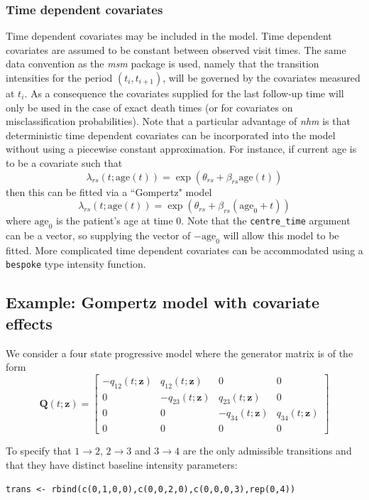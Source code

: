 \documentclass{article}
\numberwithin{equation}{section}
\begin{document}
\subsubsection{Time dependent covariates}

Time dependent covariates may be included in the model. Time dependent covariates are assumed to be constant between observed visit times. The same data convention as the {\it msm} package is used, namely that  the transition intensities for the period $(t_i, t_{i+1})$, will be governed by the covariates measured at $t_i$. As a consequence the covariates supplied for the last follow-up time will only be used in the case of exact death times (or for covariates on misclassification probabilities). Note that a particular advantage of {\it nhm} is that deterministic time dependent covariates can be incorporated into the model without using a piecewise constant approximation. For instance, if current age is to be a covariate such that
$$\lambda_{rs}(t ; \mbox{age}(t)) = \exp(\theta_{rs} + \beta_{rs} \mbox{age}(t))$$
then this can be fitted via a ``Gompertz" model
$$\lambda_{rs}(t ; \mbox{age}(t)) = \exp(\theta_{rs} + \beta_{rs} (\mbox{age}_0 + t))$$
where $\mbox{age}_0$ is the patient's age at time 0. 
Note that the \verb!centre_time! argument can be a vector, so supplying the vector of $-\mbox{age}_0$ will allow this model to be fitted. More complicated time dependent covariates can be accommodated using a \verb!bespoke! type intensity function.

\subsection{Example: Gompertz model with covariate effects}
\label{sec:gomp_model1}

We consider a four state progressive model where the generator matrix is of the form
$$\mathbf{Q}(t; \mathbf{z}) = \begin{bmatrix} -q_{12}(t  ; \mathbf{z}) & q_{12}(t  ; \mathbf{z}) & 0 & 0 \\
0 & -q_{23}(t ; \mathbf{z}) & q_{23}(t ; \mathbf{z}) & 0 \\
0 & 0 &-q_{34}(t ; \mathbf{z}) & q_{34}(t ; \mathbf{z}) \\
0 & 0 & 0 & 0 \end{bmatrix}$$

To specify that $1 \rightarrow 2$, $2 \rightarrow 3$ and $3 \rightarrow 4$ are the only admissible transitions and that they have distinct baseline intensity parameters:
\begin{verbatim}
trans <- rbind(c(0,1,0,0),c(0,0,2,0),c(0,0,0,3),rep(0,4))
\end{verbatim}
\end{document}
